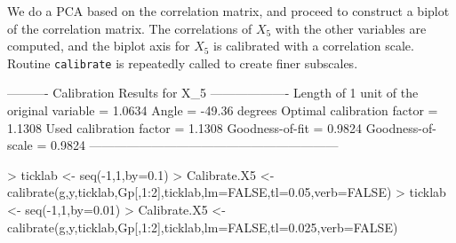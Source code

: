 \documentclass[a4paper]{article}
\begin{document}
We do a PCA based on the correlation matrix, and proceed to construct a biplot of the correlation matrix. The
correlations of $X_5$ with the other variables are computed, and the biplot axis for $X_5$ is calibrated with a 
correlation scale. Routine {\tt calibrate} is repeatedly called to create finer subscales.

\begin{Schunk}
\begin{Soutput}
---------- Calibration Results for  X_5  -------------------
Length of 1 unit of the original variable =  1.0634  
Angle                                     =  -49.36 degrees
Optimal calibration factor                =  1.1308  
Used calibration factor                   =  1.1308  
Goodness-of-fit                           =  0.9824  
Goodness-of-scale                         =  0.9824  
------------------------------------------------------------
\end{Soutput}
\begin{Sinput}
> ticklab <- seq(-1,1,by=0.1)
> Calibrate.X5 <- calibrate(g,y,ticklab,Gp[,1:2],ticklab,lm=FALSE,tl=0.05,verb=FALSE)
> ticklab <- seq(-1,1,by=0.01)
> Calibrate.X5 <- calibrate(g,y,ticklab,Gp[,1:2],ticklab,lm=FALSE,tl=0.025,verb=FALSE)
\end{Sinput}
\end{Schunk}
\end{document}
